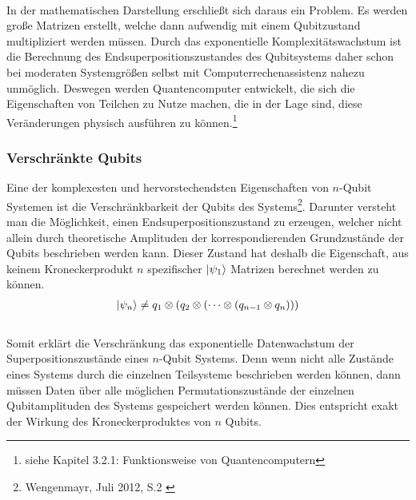 \documentclass[12pt]{report}
\begin{document}
\quad \vspace{-0.5cm} \\  In der mathematischen Darstellung erschließt sich daraus ein Problem. Es werden große Matrizen erstellt, welche dann aufwendig mit einem Qubitzustand multipliziert werden müssen. Durch das exponentielle Komplexitätswachstum ist die Berechnung des Endsuperpositionszustandes des Qubitsystems daher schon bei moderaten Systemgrößen selbst mit Computerrechenassistenz nahezu unmöglich. Deswegen werden Quantencomputer entwickelt, die sich die Eigenschaften von Teilchen zu Nutze machen, die in der Lage sind, diese Veränderungen physisch ausführen zu können.\footnote{siehe Kapitel 3.2.1: Funktionsweise von Quantencomputern}

\subsubsection{Verschränkte Qubits}							%
Eine der komplexesten und hervorstechendsten Eigenschaften von $n$-Qubit Systemen ist die Verschränkbarkeit der Qubits des Systems\footnote{Wengenmayr, Juli 2012, S.2 \cite{p221-7}}.
Darunter versteht man die Möglichkeit, einen Endsuperpositionszustand zu erzeugen, welcher nicht allein durch theoretische Amplituden der korrespondierenden Grundzustände der Qubits beschrieben werden kann. Dieser Zustand hat deshalb die Eigenschaft, 
aus keinem Kroneckerprodukt $n$ spezifischer $\ket{\psi_1}$ Matrizen berechnet werden zu können.
\begin{align*}
\ket{\psi_n} \neq q_1 \otimes (q_2 \otimes(\cdots \otimes (q_{n-1} \otimes q_n))) \\
\end{align*} \vspace{-0.8cm} \\
Somit erklärt die Verschränkung das exponentielle Datenwachstum der Superpositionszustände eines $n$-Qubit Systems. Denn wenn nicht alle Zustände eines Systems durch die einzelnen Teilsysteme beschrieben werden können, dann müssen Daten über alle möglichen Permutationszustände der einzelnen Qubitamplituden des Systems gespeichert werden können. Dies entspricht exakt der Wirkung des Kroneckerproduktes von $n$ Qubits.

\newpage
\end{document}
